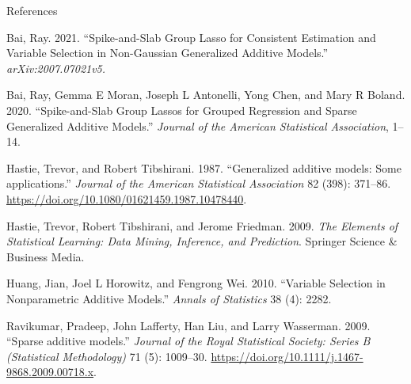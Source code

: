 \documentclass[
  ignorenonframetext,
  aspectratio=169]{beamer}
\newlength{\cslhangindent}
\newlength{\cslentryspacingunit} %
\newenvironment{CSLReferences}[2] %
 {%
  \setlength{\parindent}{0pt}
  \ifodd #1
  \let\oldpar\par
  \def\par{\hangindent=\cslhangindent\oldpar}
  \fi
  \setlength{\parskip}{#2\cslentryspacingunit}
 }%
 {}
\begin{document}


\begin{frame}[allowframebreaks]{References}
\hypertarget{refs}{}
\begin{CSLReferences}{1}{0}
\leavevmode{}%
Bai, Ray. 2021. {``Spike-and-Slab Group Lasso for Consistent Estimation
and Variable Selection in Non-Gaussian Generalized Additive Models.''}
\emph{arXiv:2007.07021v5.}

\leavevmode{}%
Bai, Ray, Gemma E Moran, Joseph L Antonelli, Yong Chen, and Mary R
Boland. 2020. {``Spike-and-Slab Group Lassos for Grouped Regression and
Sparse Generalized Additive Models.''} \emph{Journal of the American
Statistical Association}, 1--14.

\leavevmode{}%
Hastie, Trevor, and Robert Tibshirani. 1987. {``{Generalized additive
models: Some applications}.''} \emph{Journal of the American Statistical
Association} 82 (398): 371--86.
\url{https://doi.org/10.1080/01621459.1987.10478440}.

\leavevmode{}%
Hastie, Trevor, Robert Tibshirani, and Jerome Friedman. 2009. \emph{The
Elements of Statistical Learning: Data Mining, Inference, and
Prediction}. Springer Science \& Business Media.

\leavevmode{}%
Huang, Jian, Joel L Horowitz, and Fengrong Wei. 2010. {``Variable
Selection in Nonparametric Additive Models.''} \emph{Annals of
Statistics} 38 (4): 2282.

\leavevmode{}%
Ravikumar, Pradeep, John Lafferty, Han Liu, and Larry Wasserman. 2009.
{``{Sparse additive models}.''} \emph{Journal of the Royal Statistical
Society: Series B (Statistical Methodology)} 71 (5): 1009--30.
\url{https://doi.org/10.1111/j.1467-9868.2009.00718.x}.


\end{CSLReferences}
\end{frame}
\end{document}
